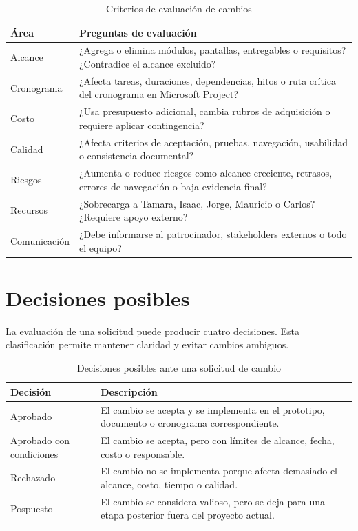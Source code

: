\documentclass[11pt,spanish]{article}
\begin{document}
\begin{table}[H]
\centering
\caption{Criterios de evaluación de cambios}
\label{tab:criterios-evaluacion-cambios}
{\small
\begin{tabularx}{\textwidth}{p{3.5cm} Y}
\toprule
\textbf{Área} & \textbf{Preguntas de evaluación} \\
\midrule
Alcance & ¿Agrega o elimina módulos, pantallas, entregables o requisitos? ¿Contradice el alcance excluido? \\
Cronograma & ¿Afecta tareas, duraciones, dependencias, hitos o ruta crítica del cronograma en Microsoft Project? \\
Costo & ¿Usa presupuesto adicional, cambia rubros de adquisición o requiere aplicar contingencia? \\
Calidad & ¿Afecta criterios de aceptación, pruebas, navegación, usabilidad o consistencia documental? \\
Riesgos & ¿Aumenta o reduce riesgos como alcance creciente, retrasos, errores de navegación o baja evidencia final? \\
Recursos & ¿Sobrecarga a Tamara, Isaac, Jorge, Mauricio o Carlos? ¿Requiere apoyo externo? \\
Comunicación & ¿Debe informarse al patrocinador, stakeholders externos o todo el equipo? \\
\bottomrule
\end{tabularx}
}
\end{table}

\section{Decisiones posibles}

La evaluación de una solicitud puede producir cuatro decisiones. Esta clasificación permite mantener claridad y evitar cambios ambiguos.

\begin{table}[H]
\centering
\caption{Decisiones posibles ante una solicitud de cambio}
\label{tab:decisiones-cambios}
{\small
\begin{tabularx}{\textwidth}{p{3cm} Y}
\toprule
\textbf{Decisión} & \textbf{Descripción} \\
\midrule
Aprobado & El cambio se acepta y se implementa en el prototipo, documento o cronograma correspondiente. \\
Aprobado con condiciones & El cambio se acepta, pero con límites de alcance, fecha, costo o responsable. \\
Rechazado & El cambio no se implementa porque afecta demasiado el alcance, costo, tiempo o calidad. \\
Pospuesto & El cambio se considera valioso, pero se deja para una etapa posterior fuera del proyecto actual. \\
\bottomrule
\end{tabularx}
}
\end{table}
\end{document}
